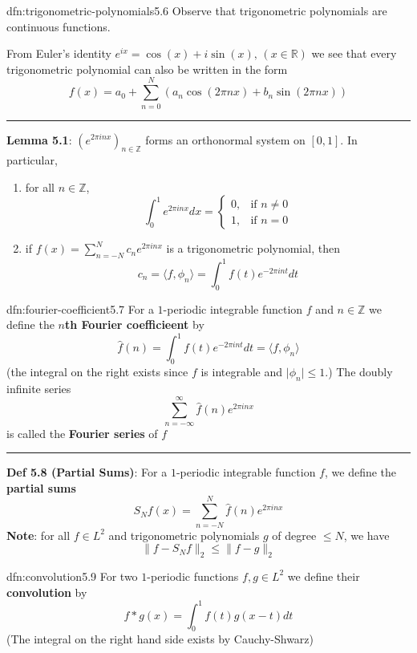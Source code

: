 \documentclass[landscape, 8pt]{extarticle}
\begin{document}
\begin{multicols}{3}
\begin{dfn}{dfn:trigonometric-polynomials}{5.6}
	Observe that trigonometric polynomials are continuous functions.

	From Euler's identity $e^{ix} = \cos(x) + i\sin(x),\, (x\in \mathbb{R})$ we see that every trigonometric polynomial can also be written in the form
	\vspace{-3pt}
	\[ f(x) = a_{0} + \sum_{n = 0}^{N}(a_{n} \cos(2\pi nx) + b_{n}\sin(2 \pi nx))\]

	\vspace{-2pt}
	\noindent\rule{\textwidth}{0.2pt}
	\textbf{Lemma 5.1}: $(e^{2 \pi inx})_{n\in \mathbb{Z}}$ forms an orthonormal system on $[0, 1]$. In particular,
	\vspace{-3pt}
	\begin{enumerate}[leftmargin=*]
	    \item for all $n\in \mathbb{Z}$,
			\[\int_{0}^{1} e^{2 \pi inx} dx = \begin{cases}
				0, & \text{if $n\ne 0$} \\
				1, & \text{if $n = 0$}
			\end{cases}\]
		\item if $f(x) = \sum_{n = -N}^{N} c_{n}e^{2 \pi inx}$ is a trigonometric polynomial, then
			\[c_{n} = \langle f, \phi_{n} \rangle = \int_{0}^{1} f(t) e^{-2 \pi i n t} dt\]
	\end{enumerate}
\end{dfn}

\begin{dfn}{dfn:fourier-coefficient}{5.7}
	For a $1$-periodic integrable function $f$ and $n\in \mathbb{Z}$ we define the \textbf{$n$th Fourier coefficieent} by
	\[\widehat{f}(n) = \int_{0}^{1} f(t)e^{-2 \pi i n t} dt = \langle f, \phi_{n} \rangle\]
	(the integral on the right exists since $f$ is integrable and $\lvert \phi_{n} \rvert \le 1$.) The doubly infinite series
	\[\sum_{n = -\infty}^{\infty} \widehat{f}(n) e^{2 \pi i n x}\]
	is called the \textbf{Fourier series} of $f$

	\noindent\rule{\textwidth}{0.2pt}
	\textbf{Def 5.8 (Partial Sums)}: For a $1$-periodic integrable function $f$, we define the \textbf{partial sums}
	\[S_{N}f(x) = \sum_{n = -N}^{N}\widehat{f}(n)e^{2 \pi inx}\]
	\textbf{Note}: for all $f\in L^{2}$ and trigonometric polynomials $g$ of degree $\le N$, we have
	\[\lVert f - S_{N} f \rVert_{2} \le \lVert f - g \rVert_{2}\]
\end{dfn}

\begin{dfn}[Convolution]{dfn:convolution}{5.9}
	For two $1$-periodic functions $f, g\in L^{2}$ we define their \textbf{convolution} by
	\[f * g(x) = \int_{0}^{1} f(t)g(x - t) dt\]
	(The integral on the right hand side exists by Cauchy-Shwarz)


\end{dfn}
\end{multicols}
\end{document}
